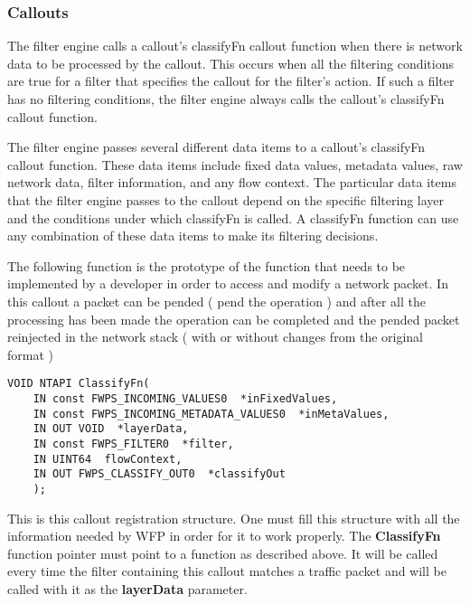 \vspace{5mm}
\subsubsection{Callouts}
\vspace{5mm}

The filter engine calls a callout's classifyFn callout function when there is network data to be processed by the callout. This occurs when all the filtering conditions are true for a filter that specifies the callout for the filter's action. If such a filter has no filtering conditions, the filter engine always calls the callout's classifyFn callout function.

\vspace{5mm}

The filter engine passes several different data items to a callout's classifyFn callout function. These data items include fixed data values, metadata values, raw network data, filter information, and any flow context. The particular data items that the filter engine passes to the callout depend on the specific filtering layer and the conditions 
under which classifyFn is called. A classifyFn function can use any combination of these data items to make its filtering decisions.

\vspace{5mm}

The following function is the prototype of the function that needs to be implemented by a developer in order to access and modify a network packet. In this callout a packet can be pended 
( pend the operation ) and after all the processing has been made the operation can be completed and the pended packet reinjected in the network stack ( with or without changes from the
original format ) 

\vspace{5mm}

\begin{lstlisting}
VOID NTAPI ClassifyFn(
    IN const FWPS_INCOMING_VALUES0  *inFixedValues,
    IN const FWPS_INCOMING_METADATA_VALUES0  *inMetaValues,
    IN OUT VOID  *layerData,
    IN const FWPS_FILTER0  *filter,
    IN UINT64  flowContext,
    IN OUT FWPS_CLASSIFY_OUT0  *classifyOut
    );
\end{lstlisting}

\vspace{5mm}

This is this callout registration structure. One must fill this structure with all the information needed by WFP in order for it to work properly. The \textbf{ClassifyFn} function pointer
must point to a function as described above. It will be called every time the filter containing this callout matches a traffic packet and will be called with it as the \textbf{layerData}
parameter.

